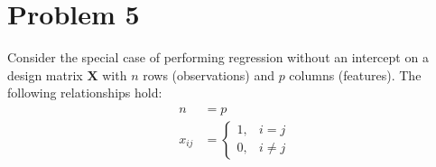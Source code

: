 \documentclass[11pt,twoside]{article}
\newcommand{\?}{\stackrel{?}{=}}
\begin{document}
\section*{Problem 5 }
Consider the special case of performing regression without an intercept on a design matrix $\bm X$ with $n$ rows (observations) and $p$ columns (features). The following relationships hold:
\begin{align}
  \label{eq:0}
  \begin{split}
  n &= p \\
  x_{ij} &=
           \begin{cases}
             1, & i = j \\
             0, & i \ne j
           \end{cases}
         \end{split}
\end{align}
\end{document}
